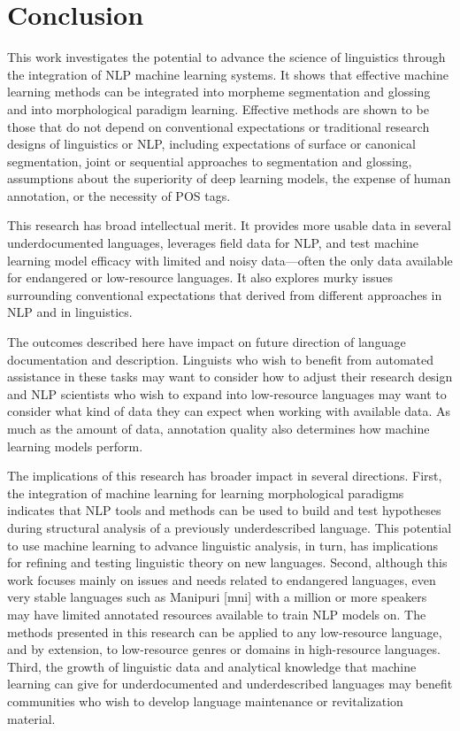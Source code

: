 \chapter{Conclusion}
\label{chap:conclusion}

This work investigates the potential to advance the science of linguistics through the integration of NLP machine learning systems. It shows that effective machine learning methods can be integrated into morpheme segmentation and glossing and into morphological paradigm learning. Effective methods are shown to be those that do not depend on conventional expectations or traditional research designs of linguistics or NLP, including expectations of surface or canonical segmentation, joint or sequential approaches to segmentation and glossing, assumptions about the superiority of deep learning models, the expense of human annotation, or the necessity of POS tags. 

This research has broad intellectual merit. It provides more usable data in several underdocumented languages, leverages field data for NLP, and test machine learning model efficacy with limited and noisy data---often the only data available for endangered or low-resource languages. It also explores murky issues surrounding conventional expectations that derived from different approaches in NLP and in linguistics.

The outcomes described here have impact on future direction of language documentation and description. Linguists who wish to benefit from automated assistance in these tasks may want to consider how to adjust their research design and NLP scientists who wish to expand into low-resource languages may want to consider what kind of data they can expect when working with available data. As much as the amount of data, annotation quality also determines how machine learning models perform.

The implications of this research has broader impact in several directions. First, the integration of machine learning for learning morphological paradigms indicates that NLP tools and methods can be used to build and test hypotheses during structural analysis of a previously underdescribed language. This potential to use machine learning to advance linguistic analysis, in turn, has implications for refining and testing linguistic theory on new languages. Second, although this work focuses mainly on issues and needs related to endangered languages, even very stable languages such as Manipuri [mni] with a million or more speakers may have limited annotated resources available to train NLP models on. The methods presented in this research can be applied to any low-resource language, and by extension, to low-resource genres or domains in high-resource languages. Third, the growth of linguistic data and analytical knowledge that machine learning can give for underdocumented and underdescribed languages may benefit communities who wish to develop language maintenance or revitalization material. 


